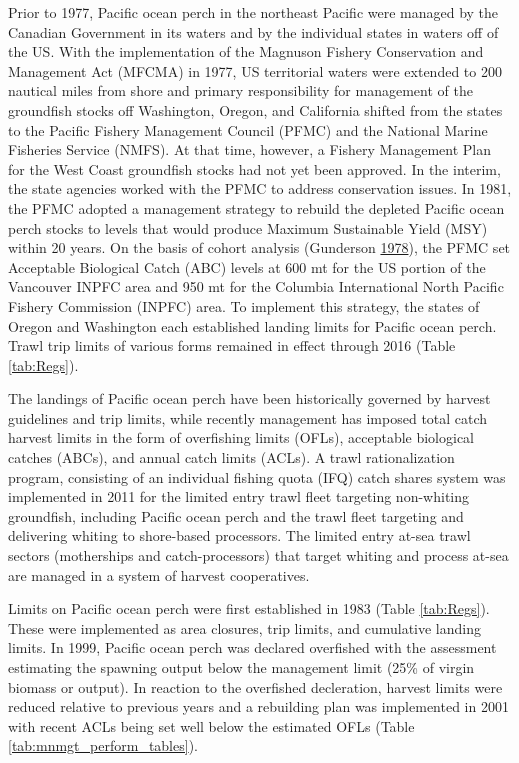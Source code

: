 \documentclass[12pt,]{article}
\begin{document}
Prior to 1977, Pacific ocean perch in the northeast Pacific were managed
by the Canadian Government in its waters and by the individual states in
waters off of the US. With the implementation of the Magnuson Fishery
Conservation and Management Act (MFCMA) in 1977, US territorial waters
were extended to 200 nautical miles from shore and primary
responsibility for management of the groundfish stocks off Washington,
Oregon, and California shifted from the states to the Pacific Fishery
Management Council (PFMC) and the National Marine Fisheries Service
(NMFS). At that time, however, a Fishery Management Plan for the West
Coast groundfish stocks had not yet been approved. In the interim, the
state agencies worked with the PFMC to address conservation issues. In
1981, the PFMC adopted a management strategy to rebuild the depleted
Pacific ocean perch stocks to levels that would produce Maximum
Sustainable Yield (MSY) within 20 years. On the basis of cohort analysis
(Gunderson \protect\hyperlink{ref-gunderson_results_1978}{1978}), the
PFMC set Acceptable Biological Catch (ABC) levels at 600 mt for the US
portion of the Vancouver INPFC area and 950 mt for the Columbia
International North Pacific Fishery Commission (INPFC) area. To
implement this strategy, the states of Oregon and Washington each
established landing limits for Pacific ocean perch. Trawl trip limits of
various forms remained in effect through 2016 (Table \ref{tab:Regs}).

The landings of Pacific ocean perch have been historically governed by
harvest guidelines and trip limits, while recently management has
imposed total catch harvest limits in the form of overfishing limits
(OFLs), acceptable biological catches (ABCs), and annual catch limits
(ACLs). A trawl rationalization program, consisting of an individual
fishing quota (IFQ) catch shares system was implemented in 2011 for the
limited entry trawl fleet targeting non-whiting groundfish, including
Pacific ocean perch and the trawl fleet targeting and delivering whiting
to shore-based processors. The limited entry at-sea trawl sectors
(motherships and catch-processors) that target whiting and process
at-sea are managed in a system of harvest cooperatives.

Limits on Pacific ocean perch were first established in 1983 (Table
\ref{tab:Regs}). These were implemented as area closures, trip limits,
and cumulative landing limits. In 1999, Pacific ocean perch was declared
overfished with the assessment estimating the spawning output below the
management limit (25\% of virgin biomass or output). In reaction to the
overfished decleration, harvest limits were reduced relative to previous
years and a rebuilding plan was implemented in 2001 with recent ACLs
being set well below the estimated OFLs (Table
\ref{tab:mnmgt_perform_tables}).
\end{document}
